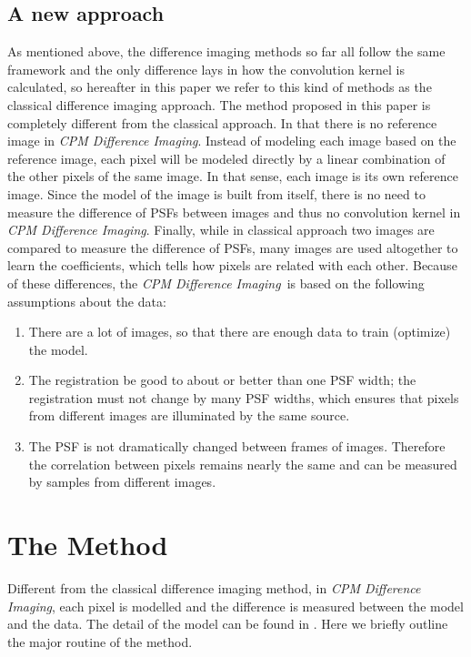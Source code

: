 \documentclass[12pt, preprint]{aastex}
\newcommand{\project}[1]{\textsl{#1}}
\newcommand{\cpmdiff}{\project{CPM Difference Imaging}}
\begin{document}
\subsection{A new approach}
As mentioned above, the difference imaging methods so far \citep{imagesub1, alard, varyingkernel, bramich} all follow the same framework and the only difference lays in how the convolution kernel is calculated, so hereafter in this paper we refer to this kind of methods as the classical difference imaging approach. 
The method proposed in this paper is completely different from the classical approach. 
In that there is no reference image in \cpmdiff. 
Instead of modeling each image based on the reference image, each pixel will be modeled directly by a linear combination of the other pixels of the same image. 
In that sense, each image is its own reference image.
Since the model of the image is built from itself, there is no need to measure the difference of PSFs between images and thus no convolution kernel in \cpmdiff. 
Finally, while in classical approach two images are compared to measure the difference of PSFs, many images are used altogether to learn the coefficients, which tells how pixels are related with each other.
Because of these differences, the \cpmdiff\ is based on the following assumptions about the data:
\begin{enumerate}
\item
There are a lot of images, so that there are enough data to train (optimize) the model.
\item
The registration be good to about or better than one PSF width; the registration must not change by many PSF widths, which ensures that pixels from different images are illuminated by the same source.
\item
The PSF is not dramatically changed between frames of images. Therefore the correlation between pixels remains nearly the same and can be measured by samples from different images.
\end{enumerate}

\section{The Method}
Different from the classical difference imaging method, in \cpmdiff, each pixel is modelled and the difference is measured between the model and the data. The detail of the model can be found in \cite{cpm}. Here we briefly outline the major routine of the method.
\end{document}
